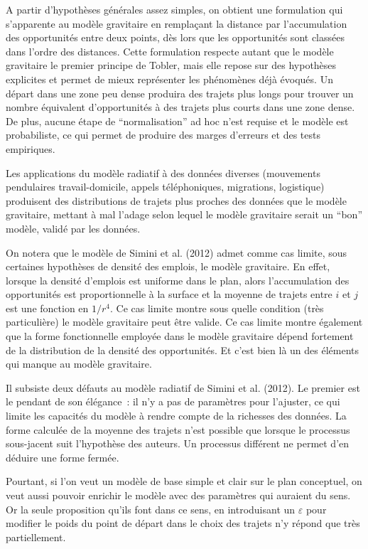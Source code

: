 \documentclass[
  10pt,
  a4paper,
  numbers=noendperiod,
  DIV=9]{scrreprt}
\begin{document}
A partir d'hypothèses générales assez simples, on obtient une
formulation qui s'apparente au modèle gravitaire en remplaçant la
distance par l'accumulation des opportunités entre deux points, dès lors
que les opportunités sont classées dans l'ordre des distances. Cette
formulation respecte autant que le modèle gravitaire le premier principe
de Tobler, mais elle repose sur des hypothèses explicites et permet de
mieux représenter les phénomènes déjà évoqués. Un départ dans une zone
peu dense produira des trajets plus longs pour trouver un nombre
équivalent d'opportunités à des trajets plus courts dans une zone dense.
De plus, aucune étape de ``normalisation'' ad hoc n'est requise et le
modèle est probabiliste, ce qui permet de produire des marges d'erreurs
et des tests empiriques.

Les applications du modèle radiatif à des données diverses (mouvements
pendulaires travail-domicile, appels téléphoniques, migrations,
logistique) produisent des distributions de trajets plus proches des
données que le modèle gravitaire, mettant à mal l'adage selon lequel le
modèle gravitaire serait un ``bon'' modèle, validé par les données.

On notera que le modèle de Simini et al. (2012) admet comme cas limite,
sous certaines hypothèses de densité des emplois, le modèle gravitaire.
En effet, lorsque la densité d'emplois est uniforme dans le plan, alors
l'accumulation des opportunités est proportionnelle à la surface et la
moyenne de trajets entre \(i\) et \(j\) est une fonction en \(1/r^4\).
Ce cas limite montre sous quelle condition (très particulière) le modèle
gravitaire peut être valide. Ce cas limite montre également que la forme
fonctionnelle employée dans le modèle gravitaire dépend fortement de la
distribution de la densité des opportunités. Et c'est bien là un des
éléments qui manque au modèle gravitaire.

Il subsiste deux défauts au modèle radiatif de Simini et al. (2012). Le
premier est le pendant de son élégance~: il n'y a pas de paramètres pour
l'ajuster, ce qui limite les capacités du modèle à rendre compte de la
richesses des données. La forme calculée de la moyenne des trajets n'est
possible que lorsque le processus sous-jacent suit l'hypothèse des
auteurs. Un processus différent ne permet d'en déduire une forme fermée.

Pourtant, si l'on veut un modèle de base simple et clair sur le plan
conceptuel, on veut aussi pouvoir enrichir le modèle avec des paramètres
qui auraient du sens. Or la seule proposition qu'ils font dans ce sens,
en introduisant un \(\varepsilon\) pour modifier le poids du point de
départ dans le choix des trajets n'y répond que très partiellement.
\end{document}
